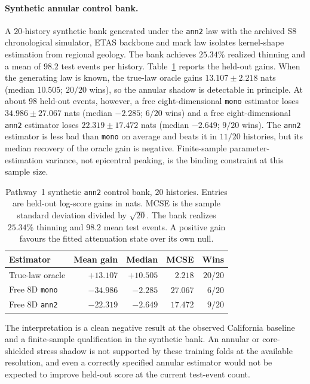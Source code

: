 \paragraph{Synthetic annular control bank.}
A $20$-history synthetic bank generated under the \texttt{ann2} law with the archived S8 chronological simulator, ETAS backbone and mark law isolates kernel-shape estimation from regional geology. The bank achieves $25.34\%$ realized thinning and a mean of $98.2$ test events per history. Table~\ref{tab:pathway1-synthetic} reports the held-out gains. When the generating law is known, the true-law oracle gains $13.107\pm2.218$ nats (median $10.505$; $20/20$ wins), so the annular shadow is detectable in principle. At about $98$ held-out events, however, a free eight-dimensional \texttt{mono} estimator loses $34.986\pm27.067$ nats (median $-2.285$; $6/20$ wins) and a free eight-dimensional \texttt{ann2} estimator loses $22.319\pm17.472$ nats (median $-2.649$; $9/20$ wins). The \texttt{ann2} estimator is less bad than \texttt{mono} on average and beats it in $11/20$ histories, but its median recovery of the oracle gain is negative. Finite-sample parameter-estimation variance, not epicentral peaking, is the binding constraint at this sample size.

\begin{table}[htbp]\centering\small
\begin{tabular}{@{}lrrrr@{}}\toprule
Estimator & Mean gain & Median & MCSE & Wins\\\midrule
True-law oracle & $+13.107$ & $+10.505$ & $2.218$ & $20/20$\\
Free 8D \texttt{mono} & $-34.986$ & $-2.285$ & $27.067$ & $6/20$\\
Free 8D \texttt{ann2} & $-22.319$ & $-2.649$ & $17.472$ & $9/20$\\
\bottomrule\end{tabular}
\caption{Pathway~1 synthetic \texttt{ann2} control bank, $20$ histories. Entries are held-out log-score gains in nats. MCSE is the sample standard deviation divided by $\sqrt{20}$. The bank realizes $25.34\%$ thinning and $98.2$ mean test events. A positive gain favours the fitted attenuation state over its own null.}
\label{tab:pathway1-synthetic}
\end{table}

The interpretation is a clean negative result at the observed California baseline and a finite-sample qualification in the synthetic bank. An annular or core-shielded stress shadow is not supported by these training folds at the available resolution, and even a correctly specified annular estimator would not be expected to improve held-out score at the current test-event count.

